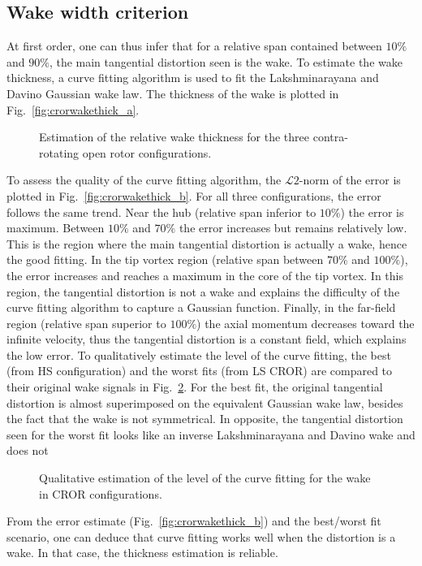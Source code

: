 \subsection{Wake width criterion}
At first order, one can thus infer that for a relative
span contained between $10\%$ and $90\%$, the main
tangential distortion seen is the wake. 
To estimate the wake thickness, a curve
fitting algorithm is used to fit the Lakshminarayana
and Davino Gaussian wake law. The thickness
of the wake is plotted in Fig.~\ref{fig:crorwakethick_a}.
\begin{figure}[htbp]
  \centering
  \caption{Estimation of the relative wake thickness for the three contra-rotating
  open rotor configurations.}
  \label{fig:crorwakethick}
\end{figure}
To assess the quality of the curve fitting
algorithm, the $\mathcal{L}2$-norm
of the error is plotted in Fig.~\ref{fig:crorwakethick_b}.
For all three configurations, the error follows the same trend.
Near the hub (relative span inferior to $10\%$) the error is
maximum. Between $10\%$ and $70\%$ the error increases but
remains relatively low. This is the region
where the main tangential distortion is
actually a wake, hence the good fitting. 
In the tip vortex region (relative
span between $70\%$ and $100\%$), the error increases
and reaches a maximum in the core of the tip vortex.
In this region, the tangential distortion is not a wake
and explains the difficulty of the curve fitting algorithm
to capture a Gaussian function.
Finally, in the far-field region (relative span superior to $100\%$)
the axial momentum decreases toward the infinite velocity, thus
the tangential distortion is a constant field, which explains
the low error.
To qualitatively estimate the level of the curve fitting,
the best (from \mockup HS configuration) and the
worst fits (from \mockup LS CROR) are compared to their
original wake signals in Fig.~\ref{fig:crorwakeestimate}.
For the best fit, the original tangential distortion is
almost superimposed on the equivalent Gaussian wake law, besides
the fact that the wake is not symmetrical. In opposite,
the tangential distortion seen for the worst fit looks like
an inverse Lakshminarayana and Davino wake and does not  
\begin{figure}[htbp]
  \centering
  \caption{Qualitative estimation of the level of the curve fitting for the
  wake in CROR configurations.}
  \label{fig:crorwakeestimate}
\end{figure}
From the error estimate (Fig.~\ref{fig:crorwakethick_b})
and the best/worst fit scenario, one can deduce that
curve fitting works well when the distortion is a wake.
In that case, the thickness estimation is reliable. 

